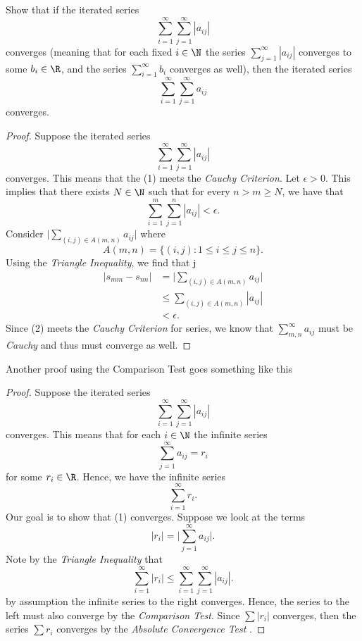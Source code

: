 Show that if the iterated series 
\[ \sum_{i=1}^{\infty} \sum_{j=1}^{\infty} |a_{ij}|\]
converges (meaning that for each fixed \( i \in \N \) the series \( \sum_{j=1}^{\infty} |a_{ij}|\) converges to some \( b_i \in \R \), and the series \( \sum_{i=1}^{\infty} b_i \) converges as well), then the iterated series 
\[ \sum_{i=1}^{\infty} \sum_{j=1}^{\infty} a_{ij}\]
converges.

\begin{proof}
Suppose the iterated series 
\[ \sum_{i=1}^{\infty} \sum_{j=1}^{\infty} |a_{ij}|  \tag{1}\]
converges. This means that the (1) meets the \textit{Cauchy Criterion}. Let \(\epsilon > 0 \). This implies that there exists \( N \in \N \) such that for every \( n > m  \geq N \), we have that 
\[ \sum_{i= 1}^{m} \sum_{j= 1}^{n} |a_{ij}| < \epsilon.\]
Consider \( \Big| \sum_{(i,j) \in A(m,n)} a_{ij} \Big|\) where 
\[  A(m,n) = \{ (i,j) : 1 \leq i \leq j \leq n \}.  \] Using the \textit{Triangle Inequality}, we find that  
j\begin{align*}
    \Big| s_{m m} - s_{nn} \Big| &= \Big| \sum_{ (i,j) \in A(m,n)} a_{ij} \Big| \\ 
                                 &\leq \sum_{(i,j) \in A(m,n)} | a_{ij} | \tag{2}\\                          &< \epsilon.
\end{align*}
Since (2) meets the \textit{Cauchy Criterion} for series, we know that \( \sum_{ m,n }^{ \infty  } a_{ij} \) must be \textit{Cauchy} and thus must converge as well. 
\end{proof}%

Another proof using the Comparison Test goes something like this

\begin{proof}
    Suppose the iterated series 
    \[ \sum_{i=1}^{\infty} \sum_{j=1}^{\infty} |a_{ij}| \]
    converges. This means that for each \( i \in \N \) the infinite series 
    \[ \sum_{j=1}^{\infty} a_{ij} = r_i \] for some \( r_i \in \R \). Hence, we have the infinite series 
    \[ \sum_{i=1}^{\infty} r_i. \tag{1} \]
    Our goal is to show that (1) converges. Suppose we look at the terms 
    \[ |r_i| = \Big| \sum_{j=1}^{\infty} a_{ij}\Big|.\]
    Note by the \textit{Triangle Inequality} that 
    \[ \sum_{i=1}^{\infty} |r_i| \leq \sum_{i=1}^{\infty} \sum_{j=1}^{\infty} |a_{ij}|.  \]
    by assumption the infinite series to the right converges. Hence, the series to the left must also converge by the \textit{Comparison Test}. Since \( \sum |r_i|\) converges, then the series 
    \( \sum r_i \) converges by the \textit{ Absolute Convergence Test }. 
\end{proof}


